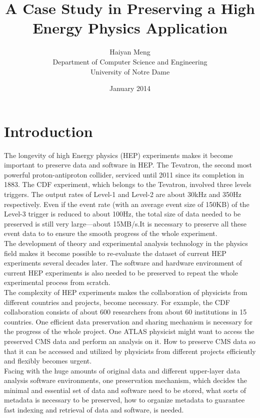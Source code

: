 \documentclass{article}
\begin{document}
\title{A Case Study in Preserving a High Energy Physics Application}
\author{Haiyan Meng\\ Department of Computer Science and Engineering\\ University of Notre Dame}
\date{January 2014}
\maketitle

\section{Introduction}

\indent The longevity of high Energy physics (HEP) experiments makes it become important to preserve data and software in HEP. The Tevatron, the second most powerful proton-antiproton collider, serviced until 2011 since its completion in 1883. The CDF experiment, which belongs to the Tevatron, involved three levels triggers. The output rates of Level-1 and Level-2 are about 30kHz and 350Hz respectively. Even if the event rate (with an average event size of 150KB) of the Level-3 trigger is reduced to about 100Hz, the total size of data needed to be preserved is still very large---about 15MB/s.It is necessary to preserve all these event data to to ensure the smooth progress of the whole experiment.\\

The development of theory and experimental analysis technology in the physics field makes it become possible to re-evaluate the dataset of current HEP experiments several decades later. The software and hardware environment of current HEP experiments is also needed to be preserved to repeat the whole experimental process from scratch. \\

The complexity of HEP experiments makes the collaboration of physicists from different countries and projects, become necessary. For example, the CDF collaboration consists of about 600 researchers from about 60 institutions in 15 countries. One efficient data preservation and sharing mechanism is necessary for the progress of the whole project. One ATLAS physicist might want to access the preserved CMS data and perform an analysis on it. How to preserve CMS data so that it can be accessed and utilized by physicists from different projects efficiently and flexibly becomes urgent.\\

Facing with the huge amounts of original data and different upper-layer data analysis software environments, one preservation mechanism, which decides the minimal and essential set of data and software need to be stored, what sorts of metadata is necessary to be preserved, how to organize metadata to guarantee fast indexing and retrieval of data and software, is needed.\\
\end{document}
